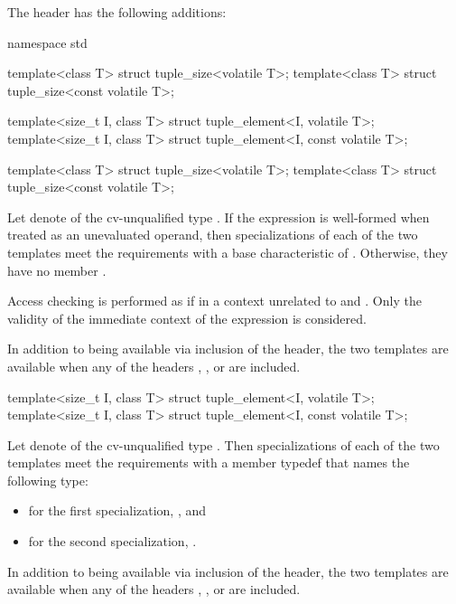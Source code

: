 \pnum
The header  has the following additions:

\begin{codeblock}
namespace std {
  template<class T> struct tuple_size<volatile T>;
  template<class T> struct tuple_size<const volatile T>;

  template<size_t I, class T> struct tuple_element<I, volatile T>;
  template<size_t I, class T> struct tuple_element<I, const volatile T>;
}
\end{codeblock}

\begin{itemdecl}
template<class T> struct tuple_size<volatile T>;
template<class T> struct tuple_size<const volatile T>;
\end{itemdecl}

\begin{itemdescr}
\pnum
Let  denote  of the cv-unqualified type .
If the expression  is well-formed
when treated as an unevaluated operand,
then specializations of each of the two templates meet
the  requirements with a base characteristic of
.
Otherwise, they have no member .

\pnum
Access checking is performed as if
in a context unrelated to  and .
Only the validity of the immediate context of the expression is considered.

\pnum
In addition to being available via inclusion of the  header,
the two templates are available when any of the headers
,
, or
are included.
\end{itemdescr}

\begin{itemdecl}
template<size_t I, class T> struct tuple_element<I, volatile T>;
template<size_t I, class T> struct tuple_element<I, const volatile T>;
\end{itemdecl}

\begin{itemdescr}
\pnum
Let  denote 
of the cv-unqualified type .
Then specializations of each of the two templates meet
the  requirements
with a member typedef  that names the following type:
\begin{itemize}
\item for the first specialization, , and
\item for the second specialization, .
\end{itemize}

\pnum
In addition to being available via inclusion of the  header,
the two templates are available when any of the headers
,
, or
are included.
\end{itemdescr}

